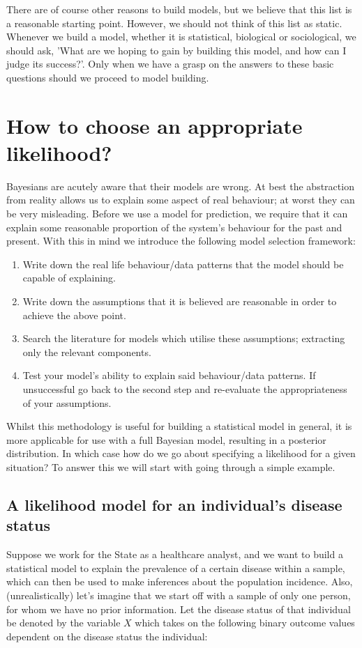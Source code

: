 \documentclass[11pt,fullpage]{book}
\begin{document}
There are of course other reasons to build models, but we believe that this list is a reasonable starting point. However, we should not think of this list as static. Whenever we build a model, whether it is statistical, biological or sociological, we should ask, 'What are we hoping to gain by building this model, and how can I judge its success?'. Only when we have a grasp on the answers to these basic questions should we proceed to model building.

\section{How to choose an appropriate likelihood?}\label{sec:chooseLikelihood}
Bayesians are acutely aware that their models are wrong. At best the abstraction from reality allows us to explain some aspect of real behaviour; at worst they can be very misleading. Before we use a model for prediction, we require that it can explain some reasonable proportion of the system's behaviour for the past and present. With this in mind we introduce the following model selection framework:

\begin{enumerate}
\item Write down the real life behaviour/data patterns that the model should be capable of explaining.
\item Write down the assumptions that it is believed are reasonable in order to achieve the above point.
\item Search the literature for models which utilise these assumptions; extracting only the relevant components.
\item Test your model's ability to explain said behaviour/data patterns. If unsuccessful go back to the second step and re-evaluate the appropriateness of your assumptions.
\end{enumerate}

Whilst this methodology is useful for building a statistical model in general, it is more applicable for use with a full Bayesian model, resulting in a posterior distribution. In which case how do we go about specifying a likelihood for a given situation? To answer this we will start with going through a simple example.

\subsection{A likelihood model for an individual's disease status}\label{sec:Likelihood_individualDisease}
Suppose we work for the State as a healthcare analyst, and we want to build a statistical model to explain the prevalence of a certain disease within a sample, which can then be used to make inferences about the population incidence. Also, (unrealistically) let's imagine that we start off with a sample of only one person, for whom we have no prior information. Let the disease status of that individual be denoted by the variable $X$ which takes on the following binary outcome values dependent on the disease status the individual:
\end{document}
